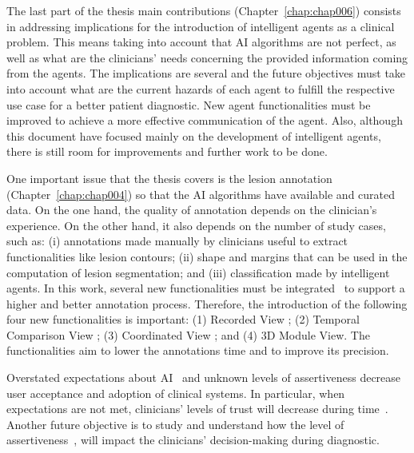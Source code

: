 The last part of the thesis main contributions (Chapter~\ref{chap:chap006}) consists in addressing implications for the introduction of intelligent agents as a clinical problem.
This means taking into account that \ac{AI} algorithms are not perfect, as well as what are the clinicians' needs concerning the provided information coming from the agents.
The implications are several and the future objectives must take into account what are the current hazards of each agent to fulfill the respective use case for a better patient diagnostic.
New agent functionalities must be improved to achieve a more effective communication of the agent.
Also, although this document have focused mainly on the development of intelligent agents, there is still room for improvements and further work to be done.

One important issue that the thesis covers is the lesion annotation (Chapter~\ref{chap:chap004}) so that the \ac{AI} algorithms have available and curated data.
On the one hand, the quality of annotation depends on the clinician’s experience.
On the other hand, it also depends on the number of study cases, such as:
(i) annotations made manually by clinicians useful to extract functionalities like lesion contours;
(ii) shape and margins that can be used in the computation of lesion segmentation; and
(iii) classification made by intelligent agents.
In this work, several new functionalities must be integrated~\cite{hugo2020si} to support a higher and better annotation process.
Therefore, the introduction of the following four new functionalities is important:
(1) Recorded View ;
(2) Temporal Comparison View ;
(3) Coordinated View ; and
(4) 3D Module View.
The functionalities aim to lower the annotations time and to improve its precision.

Overstated expectations about \ac{AI}~\cite{https://doi.org/10.13140/rg.2.2.25412.68486, calisto2019midaaiarfuv} and unknown levels of assertiveness decrease user acceptance and adoption of clinical systems.
In particular, when expectations are not met, clinicians' levels of trust will decrease during time~\cite{Kocielnik:2019:YAI:3290605.3300641}.
Another future objective is to study and understand how the level of assertiveness~\cite{10.1145/3311350.3347162, pacheco2019alignment}, will impact the clinicians' decision-making during diagnostic.

